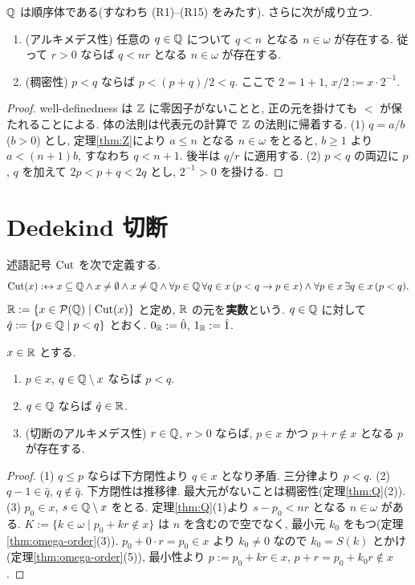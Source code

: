 \begin{thm}\label{thm:Q}
  $\mathbb{Q}$ は順序体である(すなわち (R1)--(R15) をみたす). さらに次が成り立つ.
  \begin{enumerate}[label=(\arabic*)]
    \item (アルキメデス性) 任意の $q \in \mathbb{Q}$ について $q < n$ となる $n \in \omega$ が存在する. 従って $r > 0$ ならば $q < n r$ となる $n \in \omega$ が存在する.
    \item (稠密性) $p < q$ ならば $p < (p + q)/2 < q$. ここで $2 = 1 + 1$, $x/2 := x \cdot 2^{-1}$.
  \end{enumerate}
\end{thm}
\begin{proof}
  well-definedness は $\mathbb{Z}$ に零因子がないことと, 正の元を掛けても $<$ が保たれることによる. 体の法則は代表元の計算で $\mathbb{Z}$ の法則に帰着する. (1) $q = a/b$ ($b > 0$) とし, 定理\ref{thm:Z}により $a \leq n$ となる $n \in \omega$ をとると, $b \geq 1$ より $a < (n+1) b$, すなわち $q < n + 1$. 後半は $q/r$ に適用する. (2) $p < q$ の両辺に $p$, $q$ を加えて $2p < p + q < 2q$ とし, $2^{-1} > 0$ を掛ける.
\end{proof}

\section{Dedekind 切断}

\begin{dfn}[切断と実数]\label{dfn:R}
  述語記号 $\mathrm{Cut}$ を次で定義する.
  \[ \mathrm{Cut}(x) :\leftrightarrow x \subseteq \mathbb{Q} \land x \neq \emptyset \land x \neq \mathbb{Q} \land \forall p \in \mathbb{Q}\,\forall q \in x\,(p < q \to p \in x) \land \forall p \in x\,\exists q \in x\,(p < q). \]
  $\mathbb{R} := \{x \in \mathcal{P}(\mathbb{Q}) \mid \mathrm{Cut}(x)\}$ と定め, $\mathbb{R}$ の元を\textbf{実数}という. $q \in \mathbb{Q}$ に対して $\hat q := \{p \in \mathbb{Q} \mid p < q\}$ とおく. $0_{\mathbb{R}} := \hat 0$, $1_{\mathbb{R}} := \hat 1$.
\end{dfn}

\begin{lem}\label{lem:cut-basic}
  $x \in \mathbb{R}$ とする.
  \begin{enumerate}[label=(\arabic*)]
    \item $p \in x$, $q \in \mathbb{Q} \setminus x$ ならば $p < q$.
    \item $q \in \mathbb{Q}$ ならば $\hat q \in \mathbb{R}$.
    \item (切断のアルキメデス性) $r \in \mathbb{Q}$, $r > 0$ ならば, $p \in x$ かつ $p + r \notin x$ となる $p$ が存在する.
  \end{enumerate}
\end{lem}
\begin{proof}
  (1) $q \leq p$ ならば下方閉性より $q \in x$ となり矛盾. 三分律より $p < q$.
  (2) $q - 1 \in \hat q$, $q \notin \hat q$. 下方閉性は推移律. 最大元がないことは稠密性(定理\ref{thm:Q}(2)).
  (3) $p_0 \in x$, $s \in \mathbb{Q} \setminus x$ をとる. 定理\ref{thm:Q}(1)より $s - p_0 < n r$ となる $n \in \omega$ がある. $K := \{k \in \omega \mid p_0 + k r \notin x\}$ は $n$ を含むので空でなく, 最小元 $k_0$ をもつ(定理\ref{thm:omega-order}(3)). $p_0 + 0 \cdot r = p_0 \in x$ より $k_0 \neq 0$ なので $k_0 = S(k)$ とかけ(定理\ref{thm:omega-order}(5)), 最小性より $p := p_0 + k r \in x$, $p + r = p_0 + k_0 r \notin x$.
\end{proof}

